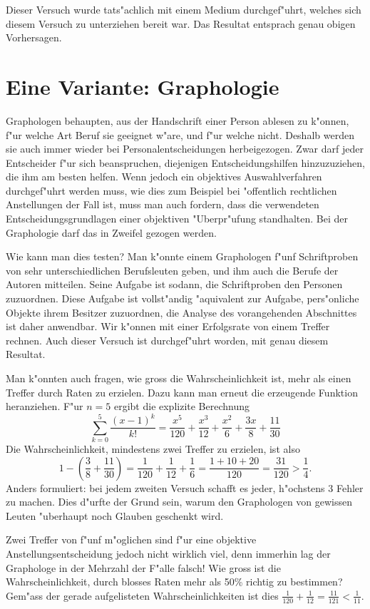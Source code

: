 Dieser Versuch wurde tats"achlich mit einem Medium durchgef"uhrt, welches
sich diesem Versuch zu unterziehen bereit war. Das Resultat entsprach genau
obigen Vorhersagen.

\section{Eine Variante: Graphologie}
Graphologen behaupten, aus der Handschrift einer Person ablesen zu k"onnen,
f"ur welche Art Beruf sie geeignet w"are, und f"ur welche nicht. Deshalb
werden sie auch immer wieder bei Personalentscheidungen herbeigezogen.
Zwar darf jeder Entscheider f"ur sich beanspruchen, diejenigen Entscheidungshilfen
hinzuzuziehen, die ihm am besten helfen. Wenn jedoch ein objektives
Auswahlverfahren durchgef"uhrt werden muss, wie dies zum Beispiel bei
"offentlich rechtlichen Anstellungen der Fall ist, muss man auch
fordern, dass die verwendeten Entscheidungsgrundlagen einer objektiven
"Uberpr"ufung standhalten. Bei der Graphologie darf das in Zweifel
gezogen werden.

Wie kann man dies testen? Man k"onnte einem Graphologen f"unf Schriftproben
von sehr unterschiedlichen Berufsleuten geben, und ihm auch die Berufe
der Autoren mitteilen. Seine Aufgabe ist sodann, die Schriftproben den
Personen zuzuordnen. Diese Aufgabe ist vollst"andig "aquivalent zur Aufgabe,
pers"onliche Objekte ihrem Besitzer zuzuordnen, die Analyse des vorangehenden
Abschnittes ist daher anwendbar. Wir k"onnen mit einer Erfolgsrate von einem
Treffer rechnen. Auch dieser Versuch ist durchgef"uhrt worden, mit genau
diesem Resultat.

Man k"onnten auch fragen, wie gross die Wahrscheinlichkeit ist, mehr als einen
Treffer durch Raten zu erzielen.
Dazu kann man erneut die erzeugende Funktion
heranziehen. F"ur $n=5$ ergibt die explizite Berechnung
$$\sum_{k=0}^5\frac{(x-1)^k}{k!}
=\frac{x^5}{120}+\frac{x^3}{12}+\frac{x^2}{6}+\frac{3 x}{8}+\frac{11}{30}
$$
Die Wahrscheinlichkeit, mindestens zwei Treffer zu erzielen, ist also
$$1-\left(\frac38+\frac{11}{30}\right)=\frac1{120}+\frac1{12}+\frac16=\frac{1+10+20}{120}=\frac{31}{120}>\frac14.$$
Anders formuliert: bei jedem zweiten Versuch schafft es jeder, h"ochstens $3$
Fehler zu machen. Dies d"urfte der Grund sein, warum den Graphologen
von gewissen Leuten "uberhaupt noch Glauben geschenkt wird.

Zwei Treffer von f"unf m"oglichen sind f"ur eine objektive Anstellungsentscheidung
jedoch nicht wirklich viel, denn immerhin lag der Graphologe in der Mehrzahl
der F"alle falsch! Wie gross ist die Wahrscheinlichkeit, durch blosses Raten
mehr als 50\% richtig zu bestimmen? Gem"ass der gerade
aufgelisteten Wahrscheinlichkeiten ist dies
$\frac1{120}+\frac1{12}=\frac{11}{121}<\frac1{11}$.

